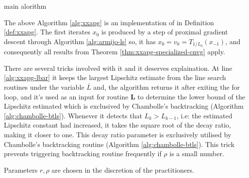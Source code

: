 \documentclass[12pt]{report}
\begin{document}
\begin{algorithm}[H]
\begin{algorithmic}[1]
{                        }
                        \label{alg:xxapg-lbar}
                        \label{alg:xxapg-rhosqrt}
                            \label{alg:xxapg-exit2}
                        \ENDIF
                    \ENDFOR
                \caption{\XXAPG{} main alorithm}\label{alg:xxapg}
                \end{algorithmic}
            \end{algorithm}
            The above Algorithm \ref{alg:xxapg} is an implementation of \XXAPG{} in Definition \ref{def:xxapg}. 
            The first iterates $x_0$ is produced by a step of proximal gradient descent through Algorithm \ref{alg:armijo-ls} so, it has $x_0 = v_0 = T_{1/L_0}(x_{-1})$, and consequently all results from Theorem \ref{thm:xxapg-specialized-cnvg} apply. 
            \par
            There are several tricks involved with it and it deserves explaination. 
            At line \ref{alg:xxapg-lbar} it keeps the largest Lipschitz estimate from the line search routines under the variable $\overline L$ and, the algorithm returns it after exiting the for loop, and it's used as an input for routine $\mathbf L$ to determine the lower bound of the Lipschitz estimated which is exclusived by Chambolle's backtracking (Algorithm \ref{alg:chambolle-btls}). 
            Whenever it detects that $L_k > L_{k - 1}$, i.e: the estimated Lipschitz constant had increased, it takes the square root of the decay ratio, making it closer to one. 
            This decay ratio parameter is exclusively utilised by Chambolle's backtracking routine (Algorithm \ref{alg:chambolle-btls}). 
            This trick prevents triggering backtracking routine frequently if $\rho$ is a small number. 
            \par
            Parameters $r, \rho$ are chosen in the discretion of the practitioners. 
\end{document}
